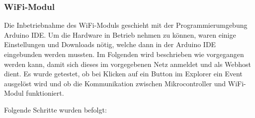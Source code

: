 \subsubsection{WiFi-Modul}
\label{subsubsec:Inbetriebnahme_ESP}

Die Inbetriebnahme des WiFi-Moduls geschieht mit der Programmierumgebung Arduino IDE. Um die Hardware in Betrieb nehmen zu können, waren einige Einstellungen und Downloads nötig, welche dann in der Arduino IDE eingebunden werden mussten. Im Folgenden wird beschrieben wie vorgegangen werden kann, damit sich dieses im vorgegebenen Netz anmeldet und als Webhost dient. Es wurde getestet, ob bei Klicken auf ein Button im Explorer ein Event ausgelöst wird und ob die Kommunikation zwischen Mikrocontroller und WiFi-Modul funktioniert.

Folgende Schritte wurden befolgt:
